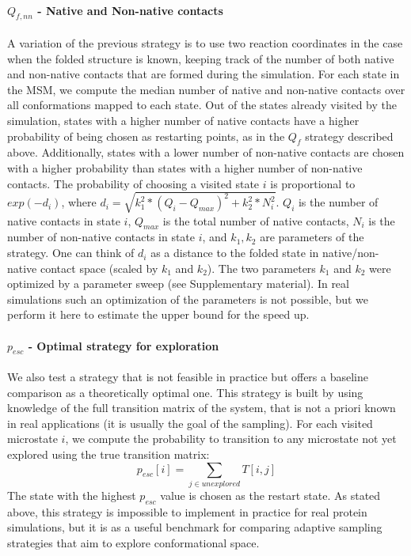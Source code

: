 \paragraph{$Q_{f,nn}$ - Native and Non-native contacts} 
A variation of the previous strategy is to use two reaction coordinates in the
case when the folded structure is known, keeping track of the number of both
native and non-native contacts that are formed during the simulation. For each
state in the MSM, we compute the median number
of native and non-native contacts over all conformations mapped to each state.
Out of the states already visited by the simulation, states with a higher
number of native contacts have a higher probability of being chosen as
restarting points, as in the $Q_{f}$ strategy described above. Additionally,
states with a lower number of non-native contacts are chosen with a higher
probability than states with a higher number of non-native contacts. The
probability of choosing a visited state $i$ is proportional to $exp(-d_i)$,
where $d_i = \sqrt{k_1^2 * (Q_i - Q_{max})^2  + k_2^2 * N_i^2}$. $Q_i$
is the number of native contacts in state $i$, $Q_{max}$ is the total number of
native contacts, $N_i$ is the number of
non-native contacts in state $i$, and $k_1, k_2$ are parameters of the
strategy. One can think of $d_i$ as a distance to the folded state in
native/non-native contact space (scaled by $k_1$ and $k_2$). The two parameters
$k_1$ and $k_2$ were optimized by a parameter sweep (see Supplementary material). 
In real simulations such an optimization of the parameters is not
possible, but we perform it here to estimate the upper bound for the speed up.

\paragraph{$p_{esc}$ - Optimal strategy for exploration}
We also test a strategy that is not feasible in practice but offers a baseline
comparison as a theoretically optimal one. This strategy is built by using knowledge
of the full transition matrix of the system, that is not a priori known in real
applications (it is usually the goal of the sampling).
For each visited microstate $i$, we
compute the probability to transition to any microstate not yet explored using
the true transition matrix:
%
$$p_{esc}[i]=\sum_{j \in unexplored}T[i, j]$$
%
The state with the highest $p_{esc}$ value is chosen as the restart state. As stated above,
this strategy is impossible to implement in practice for real protein
simulations, but it is as a useful benchmark for comparing adaptive sampling
strategies that aim to explore conformational space.

